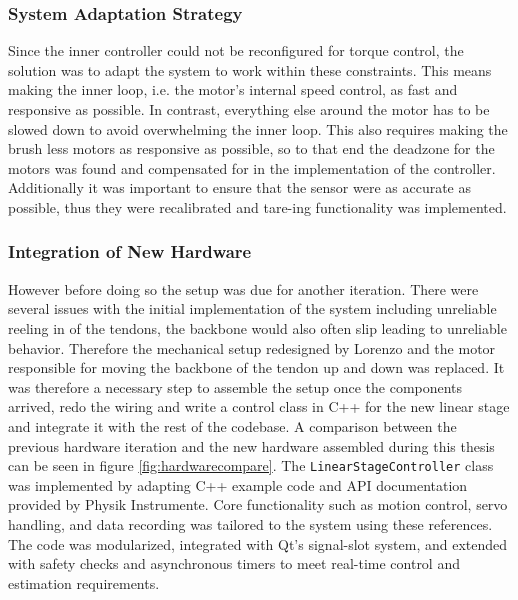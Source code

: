 \subsubsection{System Adaptation Strategy}
Since the inner controller could not be reconfigured for torque control, the solution was to adapt the system to work within these constraints. This means making the inner loop, i.e. the motor's internal speed control, as fast and responsive as possible. In contrast, everything else around the motor has to be slowed down to avoid overwhelming the inner loop.
\newline \newline
This also requires making the brush less motors as responsive as possible, so to that end the deadzone for the motors was found and compensated for in the implementation of the controller. Additionally it was important to ensure that the sensor were as accurate as possible, thus they were recalibrated and tare-ing functionality was implemented.

\subsubsection{Integration of New Hardware}
However before doing so the setup was due for another iteration. There were several issues with the initial implementation of the system including unreliable reeling in of the tendons, the backbone would also often slip leading to unreliable behavior. Therefore the mechanical setup redesigned by Lorenzo and the motor responsible for moving the backbone of the tendon up and down was replaced. It was therefore a necessary step to assemble the setup once the components arrived, redo the wiring and write a control class in C++ for the new linear stage and integrate it with the rest of the codebase. A comparison between the previous hardware iteration and the new hardware assembled during this thesis can be seen in figure \ref{fig:hardwarecompare}.
\newline \newline
The \texttt{LinearStageController} class was implemented by adapting C++ example code and API documentation provided by Physik Instrumente. Core functionality such as motion control, servo handling, and data recording was tailored to the system using these references. The code was modularized, integrated with Qt’s signal-slot system, and extended with safety checks and asynchronous timers to meet real-time control and estimation requirements.

